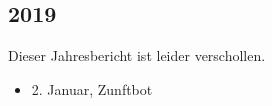 \subsection*{2019}
\begin{history}

    Dieser Jahresbericht ist leider verschollen.

    \begin{itemize}

        \item 2. Januar, Zunftbot\\

    \end{itemize}

\end{history}
